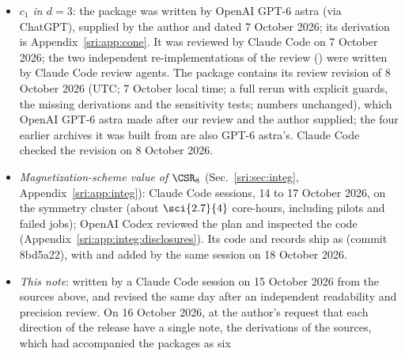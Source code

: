 \begin{itemize}
 elliptic and local checks (with the integer-interval certificate of the closed expression), and the two Hamiltonian
 packages (the solver). Its 17 archived raw records ($N=128$ to 384) were computed by GPT-6 astra in its own
 environment; their machine, dates and software versions are not recorded. Eleven of them are points of the
 continuum analysis (nine of the 23 in its joint fit; Sec.~\ref{sri:sec:cyl}), with their auxiliary sums recomputed on the
 symmetry cluster. Claude Code sessions wrote the cluster
 layer for SDSC Expanse and the symmetry cluster, ran the production and wrote the arbitrary-$N$ continuum analysis.
 OpenAI Codex reviewed the analysis plan in seven rounds, approving it at revision 7, and inspected the cluster layer
 and the analysis code twice each. The fixes made after the last inspection of each were not re-inspected (for the
 analysis, four hardening findings with no numerical change, by the author's choice).
\item \emph{$c_1$ in $d=3$}: the package was written by OpenAI GPT-6 astra (via ChatGPT), supplied by the author and
 dated 7 October 2026; its derivation is Appendix~\ref{sri:app:cone}. It was reviewed by Claude Code on 7 October 2026; the two independent re-implementations of the
 review () were written by Claude Code review agents. The package contains its review revision of
 8 October 2026 (UTC; 7 October local time; a full rerun with explicit guards, the missing derivations and the sensitivity tests; numbers
 unchanged), which OpenAI GPT-6 astra made after our review and the author supplied; the four earlier archives it was
 built from are also GPT-6 astra's. Claude Code checked the revision on 8 October 2026.
\item \emph{Magnetization-scheme value of $\CSR_8$} (Sec.~\ref{sri:sec:integ}, Appendix~\ref{sri:app:integ}): Claude Code
 sessions, 14 to 17 October 2026, on the symmetry cluster (about $\sci{2.7}{4}$ core-hours, including pilots and failed jobs); OpenAI Codex reviewed the
 plan and inspected the code (Appendix~\ref{sri:app:integ:disclosures}). Its code and records ship as
  (commit 8bd5a22), with  and  added by the same session on 18 October
 2026.
\item \emph{This note}: written by a Claude Code session on 15 October 2026 from the sources above, and revised the
 same day after an independent readability and precision review. On 16 October 2026, at the author's request that each
 direction of the release have a single note, the derivations of the sources, which had accompanied the packages as six

\end{itemize}
